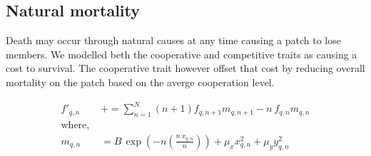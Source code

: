 \subsection{Natural mortality}
Death may occur through natural causes at any time causing a patch to lose members. We modelled beth the cooperative and competitive traits as causing a cost to survival. The cooperative trait however offset that cost by reducing overall mortality on the patch based on the averge cooperation level. 

\begin{align}
    f'_{q,n} &\mathrel{+}= \sum^N_{n=1} (n+1) f_{q, n+1} m_{q, n+1} - n\ f_{q, n} m_{q, n} \\
    \text{where, }&\nonumber\\ 
    m_{q,n} &= B\,\exp\left( -n \left( \frac{n\ x_{q,n}}{n} \right) \right) + \mu_x x_{q,n}^2 + \mu_y y_{q,n}^2
\end{align}